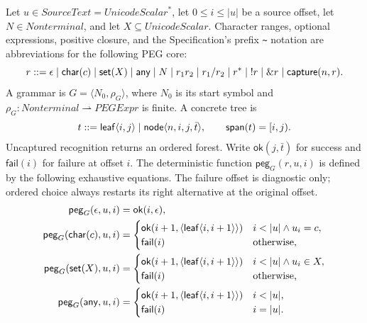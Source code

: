 Let $u\in\mathit{SourceText}=\mathit{UnicodeScalar}^{*}$, let
$0\le i\le |u|$ be a source offset, let $N\in\mathit{Nonterminal}$, and let
$X\subseteq\mathit{UnicodeScalar}$.  Character ranges, optional expressions,
positive closure, and the Specification's prefix \texttt{\textasciitilde}
notation are abbreviations for the following PEG core:
\begin{equation}\label{eq:peg-expression-domain}
 r::=\epsilon\mid\mathsf{char}(c)\mid\mathsf{set}(X)\mid\mathsf{any}
   \mid N\mid r_1r_2\mid r_1/r_2\mid r^{*}
   \mid {!r}\mid {\&r}\mid\mathsf{capture}(n,r).
\end{equation}
A grammar is $G=\langle N_0,\rho_G\rangle$, where $N_0$ is its start symbol
and $\rho_G:\mathit{Nonterminal}\rightharpoonup\mathit{PEGExpr}$ is finite.
A concrete tree is
\begin{equation}\label{eq:concrete-tree-domain}
 t::=\mathsf{leaf}\langle i,j\rangle
   \mid\mathsf{node}\langle n,i,j,\bar t\rangle,
 \qquad \mathsf{span}(t)=[i,j).
\end{equation}
Uncaptured recognition returns an ordered forest.  Write
$\mathsf{ok}(j,\bar t)$ for success and $\mathsf{fail}(i)$ for failure at
offset $i$.  The deterministic function
$\mathsf{peg}_{G}(r,u,i)$ is defined by the following exhaustive equations.
The failure offset is diagnostic only; ordered choice always restarts its
right alternative at the original offset.
\begin{equation}\label{eq:peg-atomic-recognition}
\begin{aligned}
 \mathsf{peg}_{G}(\epsilon,u,i)&=\mathsf{ok}(i,\epsilon),\\
 \mathsf{peg}_{G}(\kw{char}(c),u,i)&=
  \begin{cases}\mathsf{ok}(i+1,\langle\kw{leaf}\langle i,i+1\rangle\rangle)
       &i<|u|\land u_i=c,\\
    \mathsf{fail}(i)&\text{otherwise,}\end{cases}\\
 \mathsf{peg}_{G}(\kw{set}(X),u,i)&=
  \begin{cases}\mathsf{ok}(i+1,\langle\kw{leaf}\langle i,i+1\rangle\rangle)
       &i<|u|\land u_i\in X,\\
    \mathsf{fail}(i)&\text{otherwise,}\end{cases}\\
 \mathsf{peg}_{G}(\kw{any},u,i)&=
  \begin{cases}\mathsf{ok}(i+1,\langle\kw{leaf}\langle i,i+1\rangle\rangle)
       &i<|u|,\\
    \mathsf{fail}(i)&i=|u|.\end{cases}
\end{aligned}
\end{equation}
